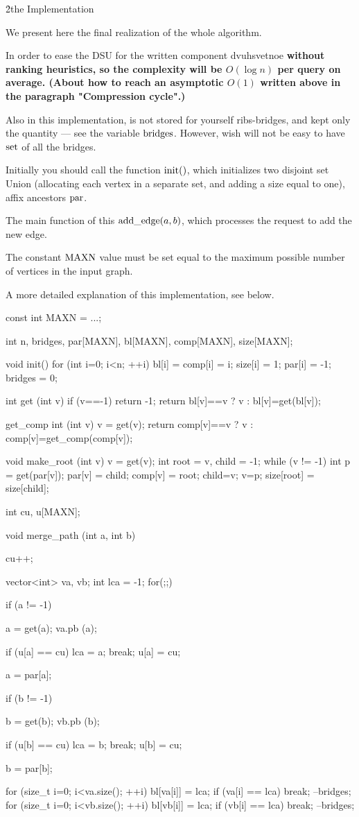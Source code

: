 \h2{the Implementation}

We present here the final realization of the whole algorithm.

In order to ease the DSU for the written component dvuhsvetnoe \bf{without ranking heuristics}, so the complexity will be $O(\log n)$ per query on average. (About how to reach an asymptotic $O(1)$ written above in the paragraph "Compression cycle".)

Also in this implementation, is not stored for yourself ribs-bridges, and kept only the quantity --- see the variable $\rm bridges$. However, wish will not be easy to have ${\rm set}$ of all the bridges.

Initially you should call the function ${\rm init}()$, which initializes two disjoint set Union (allocating each vertex in a separate set, and adding a size equal to one), affix ancestors ${\rm par}$.

The main function of this ${\rm add\_edge}(a,b)$, which processes the request to add the new edge.

The constant $\rm MAXN$ value must be set equal to the maximum possible number of vertices in the input graph.

A more detailed explanation of this implementation, see below.


\code
const int MAXN = ...;

int n, bridges, par[MAXN], bl[MAXN], comp[MAXN], size[MAXN];


void init() {
for (int i=0; i<n; ++i) {
bl[i] = comp[i] = i;
size[i] = 1;
par[i] = -1;
}
bridges = 0;
}


int get (int v) {
if (v==-1) return -1;
return bl[v]==v ? v : bl[v]=get(bl[v]);
}

get_comp int (int v) {
v = get(v);
return comp[v]==v ? v : comp[v]=get_comp(comp[v]);
}

void make_root (int v) {
v = get(v);
int root = v,
child = -1;
while (v != -1) {
int p = get(par[v]);
par[v] = child;
comp[v] = root;
child=v; v=p;
}
size[root] = size[child];
}


int cu, u[MAXN];

void merge_path (int a, int b) {
cu++;

vector<int> va, vb;
int lca = -1;
for(;;) {
if (a != -1) {
a = get(a);
va.pb (a);

if (u[a] == cu) {
lca = a;
break;
}
u[a] = cu;

a = par[a];
}

if (b != -1) {
b = get(b);
vb.pb (b);

if (u[b] == cu) {
lca = b;
break;
}
u[b] = cu;

b = par[b];
}
}

for (size_t i=0; i<va.size(); ++i) {
bl[va[i]] = lca;
if (va[i] == lca) break;
--bridges;
}
for (size_t i=0; i<vb.size(); ++i) {
bl[vb[i]] = lca;
if (vb[i] == lca) break;
--bridges;
}
}


